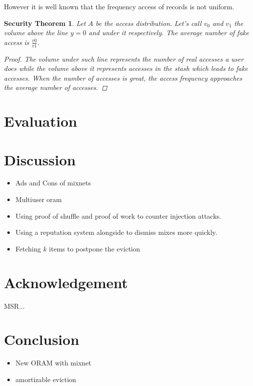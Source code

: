 \documentclass[english,oneside,twocolumn]{article}
\newtheorem{secthm}{Security Theorem}
\begin{document}
However it is well known that the frequency access of records is not uniform.
\begin{secthm}
Let $A$ be the access distribution. Let's call $v_0$ and $v_1$ the volume above the line $y=0$ and under it respectively.
The average number of fake access is $ \frac{v0}{v1}$.
\begin{proof}
 The volume under such line represents the number of real accesses a user does while the volume above it represents accesses in the stash which leads to fake accesses.
 When the number of accesses is great, the access frequency approaches the average number of accesses.
\end{proof}
\end{secthm}


\section{Evaluation}

\section{Discussion}
\label{Discussion}
\begin{itemize}
 \item Ads and Cons of mixnets
 \item Multiuser oram
 \item Using proof of shuffle and proof of work to counter injection attacks.
 \item Using a reputation system alongside to dismiss mixes more quickly.
 \item Fetching $k$ items to postpone the eviction
\end{itemize}

\section{Acknowledgement}
MSR...

\section{Conclusion}
\begin{itemize}
 \item New ORAM with mixnet
 \item amortizable eviction
\end{itemize}


{}

\end{document}
